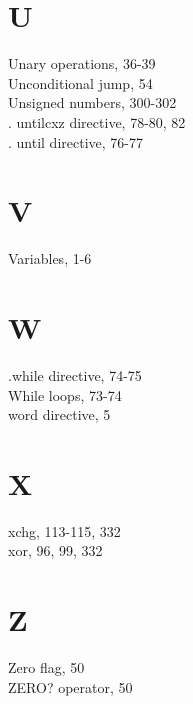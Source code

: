 \documentclass[10pt]{article}
\begin{document}
\section*{U}
Unary operations, 36-39\\
Unconditional jump, 54\\
Unsigned numbers, 300-302\\
. untilcxz directive, 78-80, 82\\
. until directive, 76-77

\section*{V}
Variables, 1-6

\section*{W}
.while directive, 74-75\\
While loops, 73-74\\
word directive, 5

\section*{X}
xchg, 113-115, 332\\
xor, 96, 99, 332

\section*{Z}
Zero flag, 50\\
ZERO? operator, 50
\end{document}
